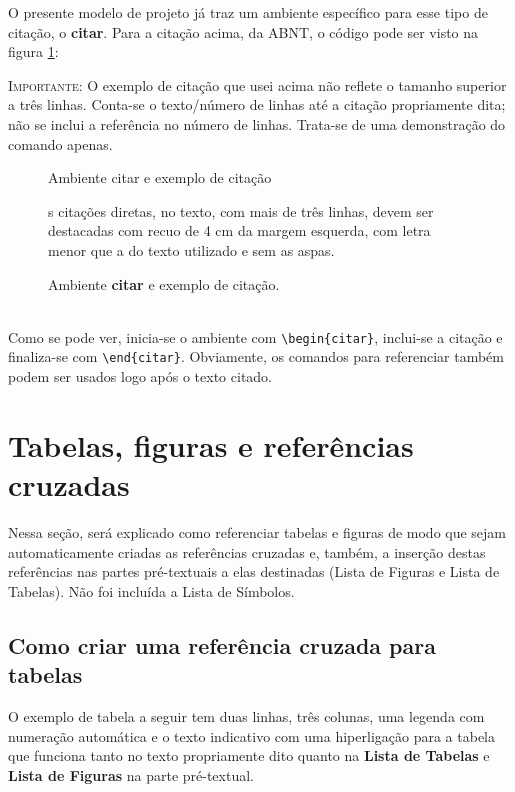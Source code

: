 \documentclass[a4paper,12pt,oneside]{memoir}
\begin{document}
O presente modelo de projeto já traz um ambiente específico para esse tipo de citação, o \textbf{citar}. Para a citação acima, da ABNT, o código pode ser visto na figura \ref{fig:codex3}:

\textsc{Importante:} O exemplo de citação que usei acima não reflete o tamanho superior a três linhas. Conta-se o texto/número de linhas até a citação propriamente dita; não se inclui a referência no número de linhas. Trata-se de uma demonstração do comando apenas.
\ \\
\begin{figure}[h!]
\begin{codex}{Ambiente citar e exemplo de citação}
  \begin{citar}
    [a]s citações diretas, no texto, com mais de três linhas, devem ser destacadas com recuo de 4 cm da margem esquerda, com letra menor que a do texto utilizado e sem as aspas. \cite[p. 2]{abnt10520}
  \end{citar}
\end{codex}
\caption{Ambiente \textbf{citar} e exemplo de citação.}
    \label{fig:codex3}
\end{figure}
\ \\
\indent Como se pode ver, inicia-se o ambiente com \verb|\begin{citar}|, inclui-se a citação e finaliza-se com \verb|\end{citar}|. Obviamente, os comandos para referenciar também podem ser usados logo após o texto citado. 

\chapter{Tabelas, figuras e referências cruzadas}
Nessa seção, será explicado como referenciar tabelas e figuras de modo que sejam automaticamente criadas as referências cruzadas e, também, a inserção destas referências nas partes pré-textuais a elas destinadas (Lista de Figuras e Lista de Tabelas). Não foi incluída a Lista de Símbolos.

\section{Como criar uma referência cruzada para tabelas}

O exemplo de tabela a seguir tem duas linhas, três colunas, uma legenda com numeração automática e o texto indicativo com uma hiperligação para a tabela que funciona tanto no texto propriamente dito quanto na \textbf{Lista de Tabelas} e \textbf{Lista de Figuras} na parte pré-textual.
\end{document}
